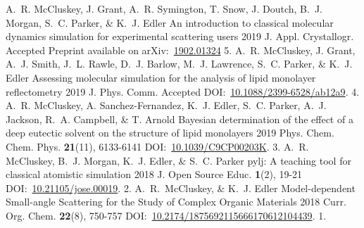 \begin{cvpubys}
  \cvpuby
    {A.~R. McCluskey, J. Grant, A.~R. Symington, T. Snow, J. Doutch, B.~J. Morgan, S.~C. Parker, \& K.~J. Edler}
    {An introduction to classical molecular dynamics simulation for experimental scattering users}
    {2019}
    {J. Appl. Crystallogr.}
    {Accepted}
    {Preprint available on arXiv:~\href{https://arxiv.org/abs/1902.01324}{1902.01324}}
    {5.}
  \cvpuby
    {A.~R. McCluskey, J. Grant, A.~J. Smith, J.~L. Rawle, D.~J. Barlow, M.~J. Lawrence, S.~C. Parker, \& K.~J. Edler}
    {Assessing molecular simulation for the analysis of lipid monolayer reflectometry}
    {2019}
    {J. Phys. Comm.}
    {Accepted}
    {DOI:~\href{https://doi.org/10.1088/2399-6528/ab12a9}{10.1088/2399-6528/ab12a9}.}
    {4.}
  \cvpuby
    {A.~R. McCluskey, A. Sanchez-Fernandez, K.~J. Edler, S.~C. Parker, A.~J. Jackson, R.~A. Campbell, \& T. Arnold}
    {Bayesian determination of the effect of a deep eutectic solvent on the structure of lipid monolayers}
    {2019}
    {Phys. Chem. Chem. Phys.}
    {\textbf{21}(11), 6133-6141}
    {DOI:~\href{https://doi.org/10.1039/C9CP00203K}{10.1039/C9CP00203K}.}
    {3.}
  \cvpuby
    {A.~R. McCluskey, B.~J. Morgan, K.~J. Edler, \& S.~C. Parker}
    {pylj: A teaching tool for classical atomistic simulation}
    {2018}
    {J. Open Source Educ.}
    {\textbf{1}(2), 19-21}
    {DOI:~\href{http://doi.org/10.21105/jose.00019}{10.21105/jose.00019}.}
    {2.}
  \cvpuby
    {A.~R.~McCluskey, \& K.~J. Edler}
    {Model-dependent Small-angle Scattering for the Study of Complex Organic Materials}
    {2018}
    {Curr. Org. Chem.}
    {\textbf{22}(8), 750-757}
    {DOI:~\href{http://doi.org/10.2174/1875692115666170612104439}{10.2174/1875692115666170612104439}.}
    {1.}
\end{cvpubys}

